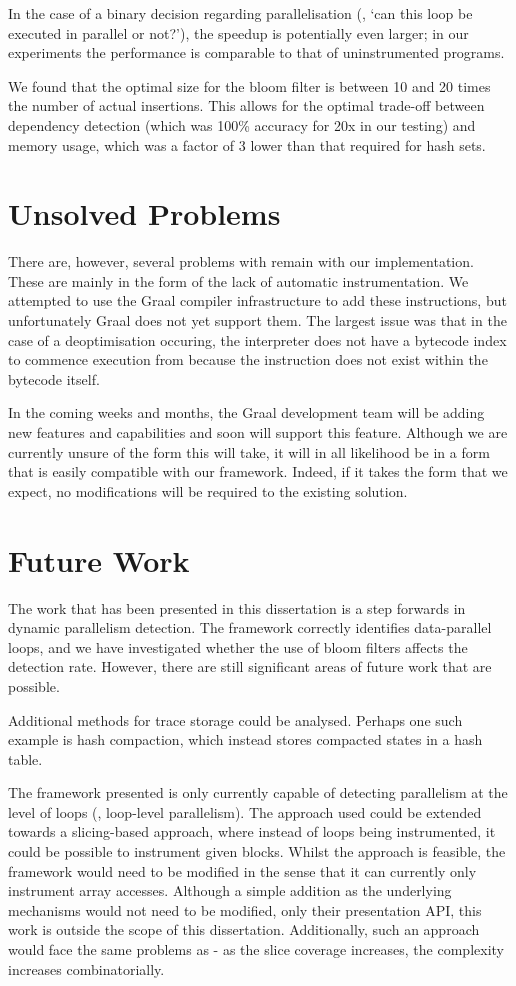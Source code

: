 In the case of a binary decision regarding parallelisation (\ie, `can this loop be executed in parallel or not?'), the speedup is potentially even larger; in our experiments the performance is comparable to that of uninstrumented programs.

We found that the optimal size for the bloom filter is between 10 and 20 times the number of actual insertions. This allows for the optimal trade-off between dependency detection (which was 100\% accuracy for 20x in our testing) and memory usage, which was a factor of 3 lower than that required for hash sets.

\section{Unsolved Problems} \label{sec:conclusion/unsolved}
There are, however, several problems with remain with our implementation. These are mainly in the form of the lack of automatic instrumentation. We attempted to use the Graal compiler infrastructure to add these instructions, but unfortunately Graal does not yet support them. The largest issue was that in the case of a deoptimisation occuring, the interpreter does not have a bytecode index to commence execution from because the instruction does not exist within the bytecode itself.

In the coming weeks and months, the Graal development team will be adding new features and capabilities and soon will support this feature. Although we are currently unsure of the form this will take, it will in all likelihood be in a form that is easily compatible with our framework. Indeed, if it takes the form that we expect, no modifications will be required to the existing solution.

\section{Future Work} \label{sec:conclusion/future-work}
The work that has been presented in this dissertation is a step forwards in dynamic parallelism detection. The framework correctly identifies data-parallel loops, and we have investigated whether the use of bloom filters affects the detection rate. However, there are still significant areas of future work that are possible.

Additional methods for trace storage could be analysed. Perhaps one such example is hash compaction, which instead stores compacted states in a hash table.

The framework presented is only currently capable of detecting parallelism at the level of loops (\ie, loop-level parallelism). The approach used could be extended towards a slicing-based approach, where instead of loops being instrumented, it could be possible to instrument given blocks. Whilst the approach is feasible, the framework would need to be modified in the sense that it can currently only instrument array accesses. Although a simple addition as the underlying mechanisms would not need to be modified, only their presentation API, this work is outside the scope of this dissertation. Additionally, such an approach would face the same problems as \citet{Wang2009} - as the slice coverage increases, the complexity increases combinatorially. 

